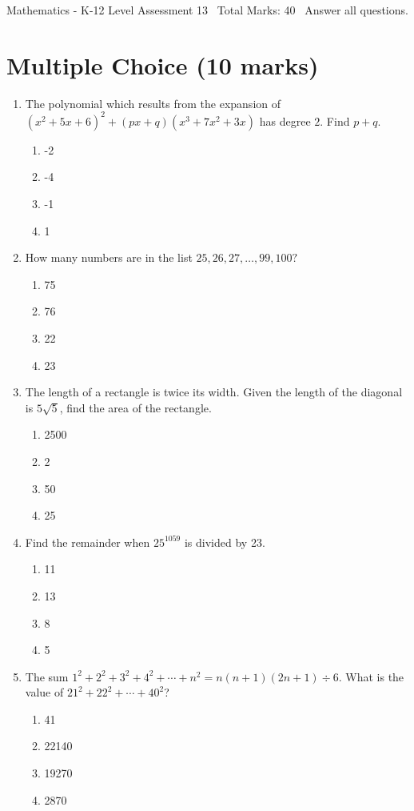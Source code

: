 \documentclass[12pt]{article}
\begin{document}
\begin{center}
Mathematics - K-12 Level Assessment 13 \
Total Marks: 40 \
Answer all questions.
\end{center}

\section*{Multiple Choice (10 marks)}
\begin{enumerate}[label=\arabic*.]
\item The polynomial which results from the expansion of $(x^2+5 x+6)^2+(px+q)(x^3+7 x^2+3 x)$ has degree $2$. Find $p+q$.
\begin{enumerate}[label=(\alph*)]
    \item -2
    \item -4
    \item -1
    \item 1
\end{enumerate}
\item How many numbers are in the list $25, 26, 27, \ldots, 99, 100 ?$
\begin{enumerate}[label=(\alph*)]
    \item 75
    \item 76
    \item 22
    \item 23
\end{enumerate}
\item The length of a rectangle is twice its width. Given the length of the diagonal is $5\sqrt{5}$, find the area of the rectangle.
\begin{enumerate}[label=(\alph*)]
    \item 2500
    \item 2
    \item 50
    \item 25
\end{enumerate}
\item Find the remainder when $25^1059$ is divided by 23.
\begin{enumerate}[label=(\alph*)]
    \item 11
    \item 13
    \item 8
    \item 5
\end{enumerate}
\item The sum $1^2 + 2^2 + 3^2 + 4^2 + \cdots + n^2 = n(n+1)(2 n+1) \div 6$. What is the value of $21^2 + 22^2 + \cdots + 40^2$?
\begin{enumerate}[label=(\alph*)]
    \item 41
    \item 22140
    \item 19270
    \item 2870
\end{enumerate}
\end{enumerate}
\end{document}

